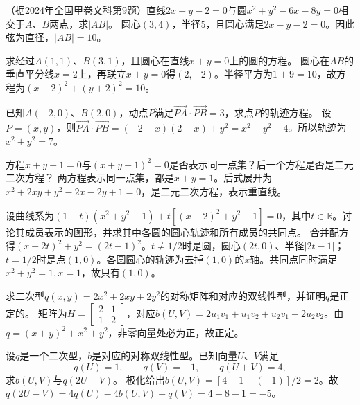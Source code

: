 （据2024年全国甲卷文科第9题）直线\(2x-y-2=0\)与圆\(x^{2}+y^{2}-6x-8y=0\)相交于\(A\)、\(B\)两点，求\(|AB|\)。
\solutionanswer
圆心\((3,4)\)，半径\(5\)，且圆心满足\(2x-y-2=0\)。因此弦为直径，\(|AB|=10\)。


求经过\(A(1,1)\)、\(B(3,1)\)，且圆心在直线\(x+y=0\)上的圆的方程。
\solutionanswer
圆心在\(AB\)的垂直平分线\(x=2\)上，再联立\(x+y=0\)得\((2,-2)\)。半径平方为\(1+9=10\)，故方程为\((x-2)^2+(y+2)^2=10\)。


已知\(A(-2,0)\)、\(B(2,0)\)，动点\(P\)满足\(\overrightarrow{PA}\cdot\overrightarrow{PB}=3\)，求点\(P\)的轨迹方程。
\solutionanswer
设\(P=(x,y)\)，则\(\vec{PA}\cdot\vec{PB}=(-2-x)(2-x)+y^2=x^2+y^2-4\)。所以轨迹为\(x^2+y^2=7\)。


方程\(x+y-1=0\)与\((x+y-1)^{2}=0\)是否表示同一点集？后一个方程是否是二元二次方程？
\solutionanswer
两方程表示同一点集，都是\(x+y=1\)。后式展开为\(x^2+2xy+y^2-2x-2y+1=0\)，是二元二次方程，表示重直线。


设曲线系为\((1-t)(x^{2}+y^{2}-1)+t[(x-2)^{2}+y^{2}-1]=0\)，其中\(t\in\mathbb{R}\)。讨论其成员表示的图形，并求其中各圆的圆心轨迹和所有成员的共同点。
\solutionanswer
合并配方得\((x-2t)^2+y^2=(2t-1)^2\)。\(t\ne1/2\)时是圆，圆心\((2t,0)\)、半径\(|2t-1|\)；\(t=1/2\)时是点\((1,0)\)。各圆圆心的轨迹为去掉\((1,0)\)的\(x\)轴。共同点同时满足\(x^2+y^2=1,x=1\)，故只有\((1,0)\)。


求二次型\(q(x,y) = 2x^{2} + 2xy + 2y^{2}\)的对称矩阵和对应的双线性型，并证明\(q\)是正定的。
\solutionanswer
矩阵为\(H=\begin{bmatrix}2&1\\1&2\end{bmatrix}\)，对应\(b(U,V)=2u_1v_1+u_1v_2+u_2v_1+2u_2v_2\)。由\(q=(x+y)^2+x^2+y^2\)，非零向量处必为正，故正定。


设\(q\)是一个二次型，\(b\)是对应的对称双线性型。已知向量\(U\)、\(V\)满足
\begin{equation*}
    q(U)=1 , \qquad q(V)=-1 , \qquad q(U+V)=4 ,
\end{equation*}
求\(b(U,V)\)与\(q(2U-V)\)。
\solutionanswer
极化给出\(b(U,V)=[4-1-(-1)]/2=2\)。故\(q(2U-V)=4q(U)-4b(U,V)+q(V)=4-8-1=-5\)。


